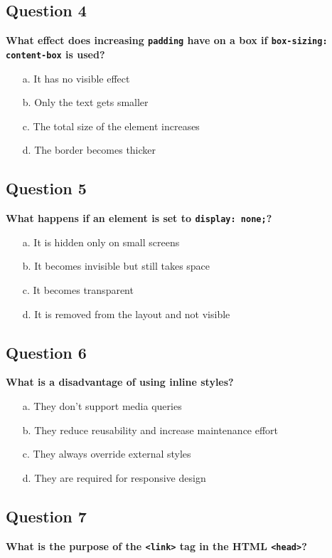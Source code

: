 \documentclass{article}
\begin{document}
\subsection*{Question 4}
\textbf{What effect does increasing \texttt{padding} have on a box if \texttt{box-sizing: content-box} is used?}

\begin{itemize}
  \item[a.] It has no visible effect
  \item[b.] Only the text gets smaller
  \item[c.] The total size of the element increases
  \item[d.] The border becomes thicker
\end{itemize}

\subsection*{Question 5}
\textbf{What happens if an element is set to \texttt{display: none;}?}

\begin{itemize}
  \item[a.] It is hidden only on small screens
  \item[b.] It becomes invisible but still takes space
  \item[c.] It becomes transparent
  \item[d.] It is removed from the layout and not visible
\end{itemize}

\subsection*{Question 6}
\textbf{What is a disadvantage of using inline styles?}

\begin{itemize}
  \item[a.] They don't support media queries
  \item[b.] They reduce reusability and increase maintenance effort
  \item[c.] They always override external styles
  \item[d.] They are required for responsive design
\end{itemize}

\subsection*{Question 7}
\textbf{What is the purpose of the \texttt{<link>} tag in the HTML \texttt{<head>}?}
\end{document}
